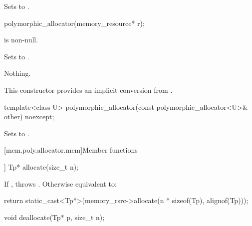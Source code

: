 \begin{itemdescr}
\pnum
\effects
Sets  to .
\end{itemdescr}

%
\begin{itemdecl}
polymorphic_allocator(memory_resource* r);
\end{itemdecl}

\begin{itemdescr}
\pnum
\requires
{} is non-null.

\pnum
\effects
Sets  to .

\pnum
\throws
Nothing.

\pnum
\begin{note}
This constructor provides an implicit conversion from .
\end{note}
\end{itemdescr}

%
\begin{itemdecl}
template<class U> polymorphic_allocator(const polymorphic_allocator<U>& other) noexcept;
\end{itemdecl}

\begin{itemdescr}
\pnum
\effects
Sets  to .
\end{itemdescr}


[mem.poly.allocator.mem]{Member functions}

%
\begin{itemdecl}
[[nodiscard]] Tp* allocate(size_t n);
\end{itemdecl}

\begin{itemdescr}
\pnum
\effects
If ,
throws .
Otherwise equivalent to:
\begin{codeblock}
return static_cast<Tp*>(memory_rsrc->allocate(n * sizeof(Tp), alignof(Tp)));
\end{codeblock}
\end{itemdescr}

%
\begin{itemdecl}
void deallocate(Tp* p, size_t n);
\end{itemdecl}

